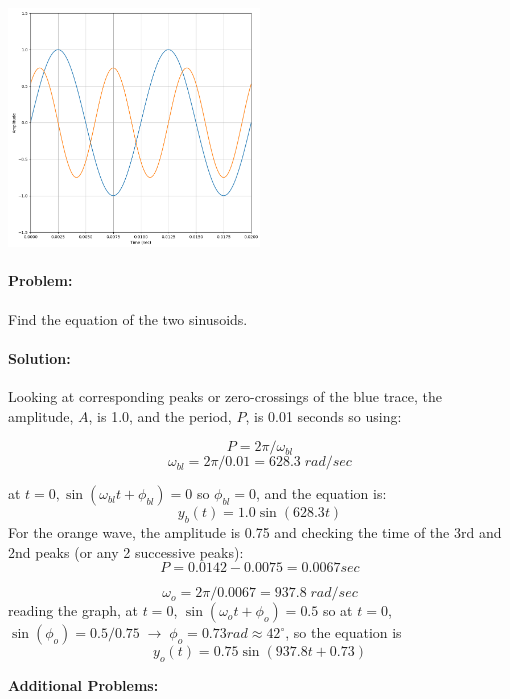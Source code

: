 \includegraphics[width=0.5\textwidth]{figsChapt02/MQ41BN02.png}

\paragraph{Problem:}
Find the equation of the two sinusoids.

\paragraph{Solution:}

Looking at corresponding peaks or zero-crossings of the blue trace, the amplitude, $A$, is 1.0, and
the period, $P$,   is 0.01 seconds so using:

\[
P  =  2\pi/\omega_{bl}
\]
\[
  \omega_{bl} = 2\pi/0.01 = 628.3 \;rad/sec
\]

at $t=0, \sin(\omega_{bl}t + \phi_{bl}) = 0$ so $\phi_{bl} = 0$, and the equation is:
  \[
    y_b(t) = 1.0\sin(628.3t)
    \]
For the orange wave, the amplitude is 0.75 and checking the time of the 3rd and 2nd peaks
(or any 2 successive peaks):
\[
P = 0.0142 - 0.0075 = 0.0067 sec
\]

\[
  \omega_o = 2\pi/0.0067 = 937.8 \;rad/sec
\]
reading the graph,
at $t=0$, $\sin(\omega_ot + \phi_o) = 0.5$ so at $t=0$, $\sin(\phi_o) = 0.5/0.75 \; \to \; \phi_o = 0.73 rad \approx 42^\circ$,
so the equation is
\[
y_o(t) = 0.75\sin(937.8t+ 0.73)
\]



{\bf Additional Problems:}

